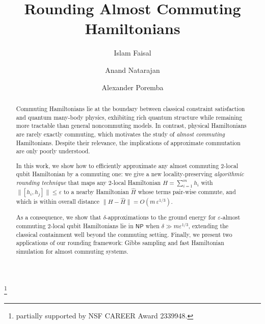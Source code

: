 \documentclass[a4paper,onecolumn,11pt]{quantumarticle}
\theoremstyle{plain}
\newcommand{\eps}{\varepsilon}
\begin{document}
\title{Rounding Almost Commuting Hamiltonians}

\author{Islam Faisal}
\author{Anand Natarajan}
\thanks{partially supported by NSF CAREER Award 2339948.}
\author{Alexander Poremba}
\maketitle

\begin{abstract}
Commuting Hamiltonians lie at the boundary between classical constraint satisfaction and quantum many-body physics, exhibiting rich quantum structure while remaining more tractable than general noncommuting models.  In contrast, physical Hamiltonians are rarely exactly commuting,
which motivates the study of \emph{almost commuting} Hamiltonians. Despite their relevance, the implications of approximate commutation are only poorly understood.

In this work, we show how to efficiently approximate any almost commuting $2$-local qubit Hamiltonian by a commuting one: we give a new locality-preserving \emph{algorithmic rounding technique} that maps any $2$-local Hamiltonian $H=\sum_{i=1}^m h_i$ with $\|[h_i,h_j]\| \leq \eps$ to a nearby Hamiltonian
$\hat{H}$ whose terms pair-wise commute, and which is within overall distance
$\|H-\hat{H}\| = O(m\,\eps^{1/3})$.

As a consequence, we show that $\delta$-approximations to the ground energy for
$\eps$-almost commuting $2$-local qubit Hamiltonians
lie in $\mathsf{NP}$ when $\delta \gg m\eps^{1/3}$, extending the classical containment well
beyond the commuting setting.   Finally, we present two applications of our rounding framework: Gibbs sampling and fast Hamiltonian simulation for almost commuting systems.
\end{abstract}
\end{document}
